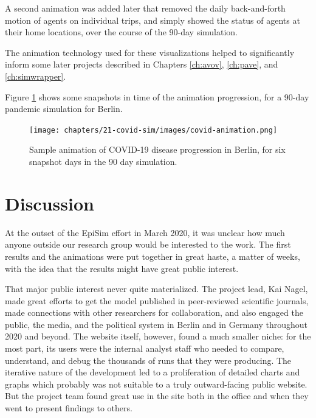 A second animation was added later that removed the daily back-and-forth motion of agents on individual trips, and simply showed the status of agents at their home locations, over the course of the 90-day simulation.

The animation technology used for these visualizations helped to significantly inform some later projects described in Chapters \ref{ch:avov}, \ref{ch:pave}, and \ref{ch:simwrapper}.

Figure \ref{fig:covid-animation} shows some snapshots in time of the animation progression, for a 90-day pandemic simulation for Berlin.

\begin{figure}
  \centering
	\begin{minipage}{\textwidth}
    \centering
    \texttt{[image: chapters/21-covid-sim/images/covid-animation.png]}
  \caption{Sample animation of COVID-19 disease progression in Berlin, for six snapshot days in the 90 day simulation.}
  \label{fig:covid-animation}
	\end{minipage}
\end{figure}

\hypertarget{covid-discussion}{%
\section{Discussion}\label{covid-discussion}}

At the outset of the EpiSim effort in March 2020, it was unclear how much anyone outside our research group would be interested to the work. The first results and the animations were put together in great haste, a matter of weeks, with the idea that the results might have great public interest.

That major public interest never quite materialized. The project lead, Kai Nagel, made great efforts to get the model published in peer-reviewed scientific journals, made connections with other researchers for collaboration, and also engaged the public, the media, and the political system in Berlin and in Germany throughout 2020 and beyond. The website itself, however, found a much smaller niche: for the most part, its users were the internal analyst staff who needed to compare, understand, and debug the thousands of runs that they were producing. The iterative nature of the development led to a proliferation of detailed charts and graphs which probably was not suitable to a truly outward-facing public website. But the project team found great use in the site both in the office and when they went to present findings to others.

